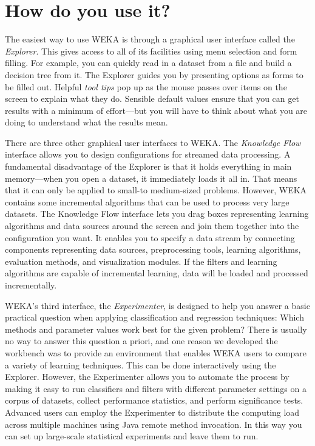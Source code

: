 \section{How do you use it?}

The easiest way to use WEKA is through a graphical user interface
called the {\em Explorer}. This gives access to all of its facilities using
menu selection and form filling. For example, you can quickly read in
a dataset from a file and build a decision tree from it. The Explorer
guides you by presenting options as forms to be filled out. Helpful
{\em tool tips} pop up as the mouse passes over items on the screen to
explain what they do. Sensible default values ensure that you can get
results with a minimum of effort---but you will have to think about what
you are doing to understand what the results mean.  

There are three other graphical user interfaces to WEKA. The {\em
Knowledge Flow} interface allows you to design configurations for
streamed data processing. A fundamental disadvantage of the Explorer
is that it holds everything in main memory---when you open a dataset,
it immediately loads it all in. That means that it can only be applied
to small-to medium-sized problems. However, WEKA contains some
incremental algorithms that can be used to process very large
datasets. The Knowledge Flow interface lets you drag boxes
representing learning algorithms and data sources around the screen
and join them together into the configuration you want. It enables you
to specify a data stream by connecting components representing data
sources, preprocessing tools, learning algorithms, evaluation methods,
and visualization modules. If the filters and learning algorithms are
capable of incremental learning, data will be loaded and processed
incrementally.  

WEKA's third interface, the {\em Experimenter}, is designed to help
you answer a basic practical question when applying classification and
regression techniques: Which methods and parameter values work best
for the given problem? There is usually no way to answer this question
a priori, and one reason we developed the workbench was to provide an
environment that enables WEKA users to compare a variety of learning
techniques. This can be done interactively using the
Explorer. However, the Experimenter allows you to automate the process
by making it easy to run classifiers and filters with different
parameter settings on a corpus of datasets, collect performance
statistics, and perform significance tests. Advanced users can employ
the Experimenter to distribute the computing load across multiple
machines using Java remote method invocation. In this way you can set
up large-scale statistical experiments and leave them to run.

